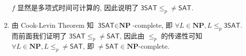 \documentclass[8pt]{article}
\theoremstyle{compact}
\def\le{\leqslant}
\begin{document}
\begin{enumerate}
\begin{enumerate}
	\end{enumerate}

	$f$ 显然是多项式时间可计算的, 因此说明了 $\textsf{3SAT} \le_p \neq\textsf{SAT}$.

	\item 由 Cook-Levin Theorem 知 $\textsf{3SAT} \in \textbf{NP}$-complete, 即 $\forall L \in \textbf{NP}, L \le_p \textsf{3SAT}$. 而前面我们证明了 $\textsf{3SAT} \le_p \neq\textsf{SAT}$, 因此由 $\le_p$ 的传递性可知 $\forall L \in \textbf{NP}, L \le_p \neq\textsf{SAT}$, 即 $\neq\textsf{SAT} \in \textbf{NP}$-complete.
\end{enumerate}
\end{document}
